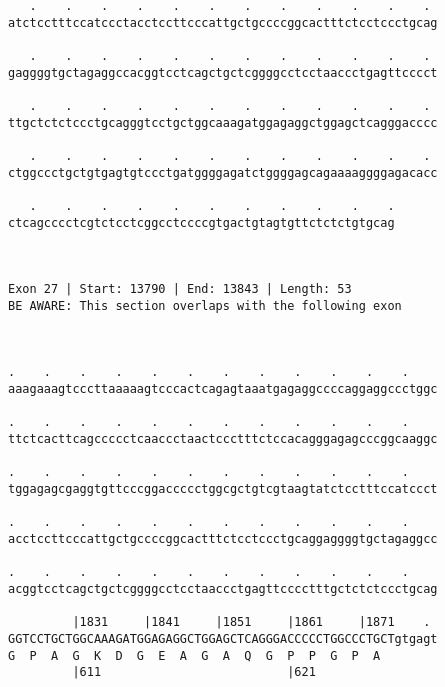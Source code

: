 \documentclass{article}
\begin{document}
\begin{Verbatim}
   .    .    .    .    .    .    .    .    .    .    .    . 
atctcctttccatccctacctccttcccattgctgccccggcactttctcctccctgcag
                                                            
   .    .    .    .    .    .    .    .    .    .    .    . 
gaggggtgctagaggccacggtcctcagctgctcggggcctcctaaccctgagttcccct
                                                            
   .    .    .    .    .    .    .    .    .    .    .    . 
ttgctctctccctgcagggtcctgctggcaaagatggagaggctggagctcagggacccc
                                                            
   .    .    .    .    .    .    .    .    .    .    .    . 
ctggccctgctgtgagtgtccctgatggggagatctggggagcagaaaaggggagacacc
                                                            
   .    .    .    .    .    .    .    .    .    .    .
ctcagcccctcgtctcctcggcctccccgtgactgtagtgttctctctgtgcag
                                                      
                                                      
 
Exon 27 | Start: 13790 | End: 13843 | Length: 53
BE AWARE: This section overlaps with the following exon



.    .    .    .    .    .    .    .    .    .    .    .    
aaagaaagtcccttaaaaagtcccactcagagtaaatgagaggccccaggaggccctggc
                                                            
.    .    .    .    .    .    .    .    .    .    .    .    
ttctcacttcagccccctcaaccctaactccctttctccacagggagagcccggcaaggc
                                                            
.    .    .    .    .    .    .    .    .    .    .    .    
tggagagcgaggtgttcccggaccccctggcgctgtcgtaagtatctcctttccatccct
                                                            
.    .    .    .    .    .    .    .    .    .    .    .    
acctccttcccattgctgccccggcactttctcctccctgcaggaggggtgctagaggcc
                                                            
.    .    .    .    .    .    .    .    .    .    .    .    
acggtcctcagctgctcggggcctcctaaccctgagttcccctttgctctctccctgcag
                                                            
         |1831     |1841     |1851     |1861     |1871    . 
GGTCCTGCTGGCAAAGATGGAGAGGCTGGAGCTCAGGGACCCCCTGGCCCTGCTgtgagt
G  P  A  G  K  D  G  E  A  G  A  Q  G  P  P  G  P  A        
         |611                          |621                 
  

\end{Verbatim}
\end{document}
